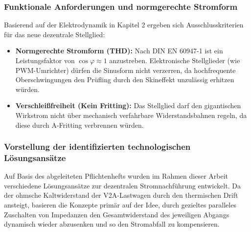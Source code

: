 \subsubsection{Funktionale Anforderungen und normgerechte Stromform}
Basierend auf der Elektrodynamik in Kapitel 2 ergeben sich Ausschlusskriterien für das neue dezentrale Stellglied:
\begin{itemize}
    \item \textbf{Normgerechte Stromform (THD):} Nach DIN EN 60947-1 ist ein Leistungsfaktor von $\cos\varphi \approx 1$ anzustreben. Elektronische Stellglieder (wie PWM-Umrichter) dürfen die Sinusform nicht verzerren, da hochfrequente Oberschwingungen den Prüfling durch den Skineffekt unzulässig erhitzen würden.
    \item \textbf{Verschleißfreiheit (Kein Fritting):} Das Stellglied darf den gigantischen Wirkstrom nicht über mechanisch verfahrbare Widerstandsbahnen regeln, da diese durch A-Fritting verbrennen würden.
\end{itemize}
\subsubsection{Vorstellung der identifizierten technologischen Lösungsansätze}
\label{sec:vorstellung_loesungsansaetze}

Auf Basis des abgeleiteten Pflichtenhefts wurden im Rahmen dieser Arbeit verschiedene Lösungsansätze zur dezentralen Stromnachführung entwickelt. Da der ohmsche Kaltwiderstand der V2A-Lastwagen durch den thermischen Drift ansteigt, basieren die Konzepte primär auf der Idee, durch gezieltes paralleles Zuschalten von Impedanzen den Gesamtwiderstand des jeweiligen Abgangs dynamisch wieder abzusenken und so den Stromabfall zu kompensieren. 

